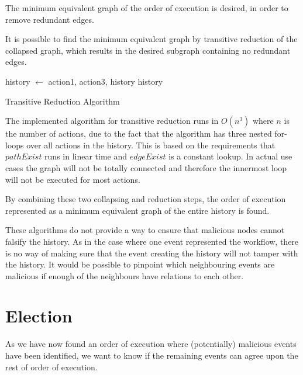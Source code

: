 	The minimum equivalent graph of the order of execution is desired, in order to remove redundant edges. 
	
	It is possible to find the minimum equivalent graph by transitive reduction of the collapsed graph, which results in the desired subgraph containing no redundant edges.
	
	\begin{algorithm}
		\begin{algorithmic}
										\State history $\leftarrow$  {action1, action3, history}
									\EndIf
								\EndIf
							\EndFor
						\EndIf
					\EndFor
				\EndFor
			\State
			\Return history
			\EndFunction
		\end{algorithmic}
		\caption{Transitive Reduction Algorithm}
	\end{algorithm}
	
	\newpar The implemented algorithm for transitive reduction runs in $O(n^3)$ where $n$ is the number of actions, due to the fact that the algorithm has three nested for-loops over all actions in the history. This is based on the requirements that $pathExist$ runs in linear time and $edgeExist$ is a constant lookup. In actual use cases the graph will not be totally connected and therefore the innermost loop will not be executed for most actions.
	
	\newpar By combining these two collapsing and reduction steps, the order of execution represented as a minimum equivalent graph of the entire history is found. 
	
	\newpar These algorithms do not provide a way to ensure that malicious nodes cannot falsify the history. As in the case where one event represented the workflow, there is no way of making sure that the event creating the history will not tamper with the history. It would be possible to pinpoint which neighbouring events are malicious if enough of the neighbours have relations to each other. 

	\section{Election}
	As we have now found an order of execution where (potentially) malicious events have been identified, we want to know if the remaining events can agree upon the rest of order of execution.
	
